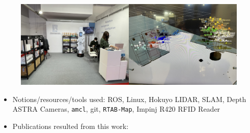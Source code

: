 \begin{figure}[H]\centering
  \includegraphics[scale=0.4]{images/relief_2.png}
  \caption{}
  \label{fig:relief_2}
\end{figure}


\begin{itemize}
\item Notions/resources/tools used: ROS, Linux, Hokuyo LIDAR, SLAM, Depth ASTRA Cameras, \texttt{amcl}, git, \texttt{RTAB-Map}, Impinj R420 RFID Reader
\item Publications resulted from this work: \cite{8739423,8739486,Filotheou2020a,9109328,9244904,Filotheou2020b,9566425,9617436}
\end{itemize}
